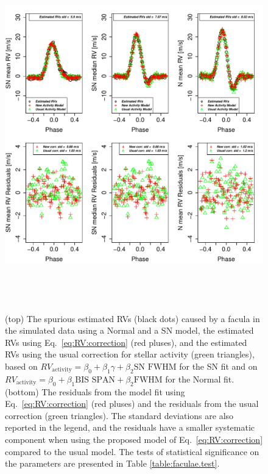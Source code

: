 \documentclass{aa}
\begin{document}
\begin{figure}[htbp]
\begin{center}
\includegraphics[height = 6in]{FACULA_COMPARISON_withNoise.pdf} 
   \caption{(top) The spurious estimated RVs (black dots) caused by a facula in the simulated data using a Normal and a SN model, the estimated RVs using Eq.~\eqref{eq:RV:correction} (red pluses), and the estimated RVs using the usual correction for stellar activity (green triangles), based on $RV_{\text{activity}}=\beta_0+\beta_1 \gamma + \beta_2 \text{SN FWHM}$ for the SN fit and on $RV_{\text{activity}}=\beta_0+\beta_1 \text{BIS SPAN} + \beta_2 \text{FWHM}$ for the Normal fit.    
 (bottom) The residuals from the model fit using Eq.~\eqref{eq:RV:correction} (red pluses) and the residuals from the usual correction (green triangles). The standard deviations are also reported in the legend, and the residuals have a smaller systematic component when using the proposed model of Eq.~\eqref{eq:RV:correction} compared to the usual model.
The tests of statistical significance on the parameters are presented in Table \ref{table:faculae.test}.
}\label{fig:faculae.correction}
\end{center}
\end{figure}
\end{document}
